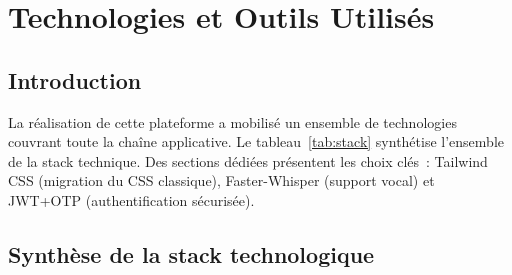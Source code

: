 \documentclass[12pt,a4paper]{report}
\begin{document}
\chapter{Technologies et Outils Utilisés}
\label{chap:technos}

\section{Introduction}

La réalisation de cette plateforme a mobilisé un ensemble de technologies couvrant toute la chaîne applicative. Le tableau~\ref{tab:stack} synthétise l'ensemble de la stack technique. Des sections dédiées présentent les choix clés~: Tailwind CSS (migration du CSS classique), Faster-Whisper (support vocal) et JWT+OTP (authentification sécurisée).

\clearpage
\section{Synthèse de la stack technologique}
\end{document}
